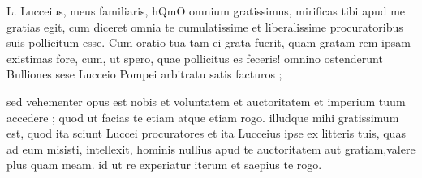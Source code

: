 


 L. Lucceius, meus familiaris, hQmO omnium gratissimus, mirificas tibi apud me gratias egit, cum diceret omnia te cumulatissime et liberalissime procuratoribus suis pollicitum esse. Cum oratio tua tam ei grata fuerit, quam gratam rem ipsam existimas fore, cum, ut spero, quae pollicitus es feceris! omnino ostenderunt Bulliones sese Lucceio Pompei arbitratu satis facturos ;

 sed vehementer opus est nobis et voluntatem et auctoritatem et imperium tuum accedere ; quod ut facias te etiam atque etiam rogo. illudque mihi gratissimum est, quod ita sciunt Luccei procuratores et ita Lucceius ipse ex litteris tuis, quas ad eum misisti, intellexit, hominis nullius apud te auctoritatem aut gratiam,valere plus quam meam. id ut re experiatur iterum et saepius te rogo.
